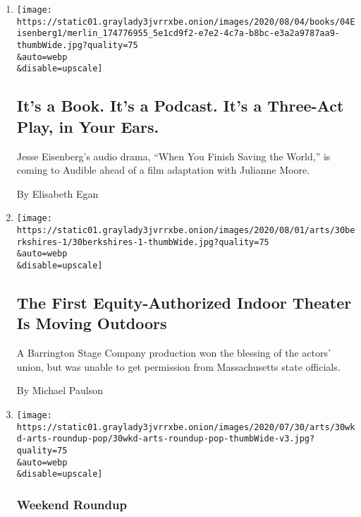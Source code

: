 \begin{enumerate}
\def\labelenumi{\arabic{enumi}.}
\item
  \href{/2020/08/02/books/jesse-eisenberg-when-you-finish-saving-the-world-audio.html}{}

  \texttt{[image: https://static01.graylady3jvrrxbe.onion/images/2020/08/04/books/04Eisenberg1/merlin\_174776955\_5e1cd9f2-e7e2-4c7a-b8bc-e3a2a9787aa9-thumbWide.jpg?quality=75\\\&auto=webp\\\&disable=upscale]}

  \hypertarget{its-a-book-its-a-podcast-its-a-three-act-play-in-your-ears}{%
  \subsection{It's a Book. It's a Podcast. It's a Three-Act Play, in
  Your
  Ears.}\label{its-a-book-its-a-podcast-its-a-three-act-play-in-your-ears}}

  Jesse Eisenberg's audio drama, ``When You Finish Saving the World,''
  is coming to Audible ahead of a film adaptation with Julianne Moore.

  By Elisabeth Egan
\item
  \href{/2020/07/30/theater/the-first-equity-authorized-indoor-theater-is-moving-outdoors.html}{}

  \texttt{[image: https://static01.graylady3jvrrxbe.onion/images/2020/08/01/arts/30berkshires-1/30berkshires-1-thumbWide.jpg?quality=75\\\&auto=webp\\\&disable=upscale]}

  \hypertarget{the-first-equity-authorized-indoor-theater-is-moving-outdoors}{%
  \subsection{The First Equity-Authorized Indoor Theater Is Moving
  Outdoors}\label{the-first-equity-authorized-indoor-theater-is-moving-outdoors}}

  A Barrington Stage Company production won the blessing of the actors'
  union, but was unable to get permission from Massachusetts state
  officials.

  By Michael Paulson
\item
  \href{/2020/07/30/arts/things-to-do-weekend-coronavirus.html}{}

  \texttt{[image: https://static01.graylady3jvrrxbe.onion/images/2020/07/30/arts/30wkd-arts-roundup-pop/30wkd-arts-roundup-pop-thumbWide-v3.jpg?quality=75\\\&auto=webp\\\&disable=upscale]}

  \hypertarget{weekend-roundup}{%
  \subsubsection{Weekend Roundup}\label{weekend-roundup}}


\end{enumerate}
